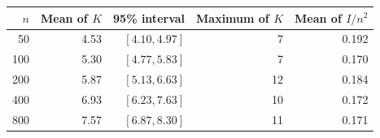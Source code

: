 \begin{tabular}{rrrrr}\toprule
	$n$ & Mean of $K$ & 95\% interval & Maximum of $K$ & Mean of $I/n^2$\\\midrule
	50 & 4.53 & $[4.10,4.97]$ & 7 & 0.192\\
	100 & 5.30 & $[4.77,5.83]$ & 7 & 0.170\\
	200 & 5.87 & $[5.13,6.63]$ & 12 & 0.184\\
	400 & 6.93 & $[6.23,7.63]$ & 10 & 0.172\\
	800 & 7.57 & $[6.87,8.30]$ & 11 & 0.171\\
	\bottomrule
\end{tabular}
